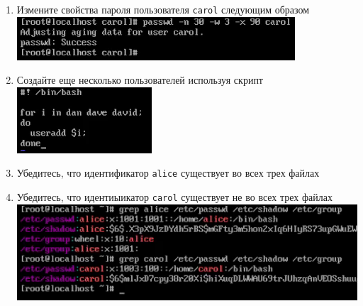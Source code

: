 \documentclass[12pt]{article}
\begin{document}
\begin{enumerate}
        \item Измените свойства пароля пользователя \texttt{carol} следующим образом
          \\\includegraphics{10.png}\\
        \item Создайте еще несколько пользователей используя скрипт
          \\\includegraphics{11.png}\\
        \item Убедитесь, что идентификатор \texttt{alice} существует во всех трех файлах
        \item Убедитесь, что идентиыикатор \texttt{carol} существует не во всех трех файлах
          \\\includegraphics{12.png}\\
      \end{enumerate}
\end{document}
